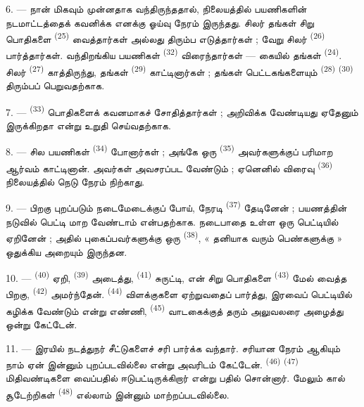 6. --- நான் மிகவும் முன்னதாக வந்திருந்ததால், நிலையத்தில் பயணிகளின்
நடமாட்டத்தைக் கவனிக்க எனக்கு ஓய்வு நேரம் இருந்தது. சிலர் தங்கள்
சிறு பொதிகளை  \textsuperscript{(25)}
வைத்தார்கள் அல்லது திரும்ப எடுத்தார்கள் ; வேறு சிலர்  \textsuperscript{(26)} பார்த்தார்கள். வந்திறங்கிய
பயணிகள்  \textsuperscript{(32)}
விரைந்தார்கள் — கையில் தங்கள் 
\textsuperscript{(24)}.
சிலர்  \textsuperscript{(27)}
காத்திருந்து, தங்கள்  \textsuperscript{(29)}
காட்டினார்கள் ; தங்கள் பெட்டகங்களையும் 
\textsuperscript{(28)}  \textsuperscript{(30)}
திரும்பப் பெறுவதற்காக.

7. ---  \textsuperscript{(33)} பொதிகளைக்
கவனமாகச் சோதித்தார்கள் ; அறிவிக்க வேண்டியது ஏதேனும் இருக்கிறதா
என்று உறுதி செய்வதற்காக.

8. --- சில பயணிகள்  \textsuperscript{(34)}
போனார்கள் ; அங்கே ஒரு  \textsuperscript{(35)}
அவர்களுக்குப் பரிமாற ஆர்வம் காட்டினான். அவர்கள் அவசரப்பட வேண்டும் ;
ஏனெனில் விரைவு  \textsuperscript{(36)} நிலையத்தில் நெடு
நேரம் நிற்காது.

9. --- பிறகு புறப்படும் நடைமேடைக்குப் போய், நேரடி  \textsuperscript{(37)} தேடினேன் ; பயணத்தின் நடுவில் பெட்டி
மாற வேண்டாம் என்பதற்காக. நடைபாதை உள்ள ஒரு பெட்டியில் ஏறினேன் ; அதில்
புகைப்பவர்களுக்கு ஒரு  \textsuperscript{(38)},
« தனியாக வரும் பெண்களுக்கு » ஒதுக்கிய அறையும் இருந்தன.

\VUsaut{3.0mm}

10. ---  \textsuperscript{(40)} ஏறி,
 \textsuperscript{(39)} அடைத்து, 
\textsuperscript{(41)} சுருட்டி, என் சிறு பொதிகளை  \textsuperscript{(43)} மேல் வைத்த பிறகு,
 \textsuperscript{(42)} அமர்ந்தேன்.
 \textsuperscript{(44)} விளக்குகளை ஏற்றுவதைப்
பார்த்து, இரவைப் பெட்டியில் கழிக்க வேண்டும் என்று எண்ணி,
 \textsuperscript{(45)} வாடகைக்குத் தரும்
அலுவலரை அழைத்து ஒன்று கேட்டேன்.

11. --- இரயில் நடத்துநர் சீட்டுகளைச் சரி பார்க்க வந்தார். சரியான
நேரம் ஆகியும் நாம் ஏன் இன்னும் புறப்படவில்லை என்று அவரிடம்
கேட்டேன்.  \textsuperscript{(46)}
 \textsuperscript{(47)} மிதிவண்டிகளை
வைப்பதில் ஈடுபட்டிருக்கிறார் என்று பதில் சொன்னார். மேலும்
கால் சூடேற்றிகள் \textsuperscript{(48)} எல்லாம் இன்னும்
மாற்றப்படவில்லை.


